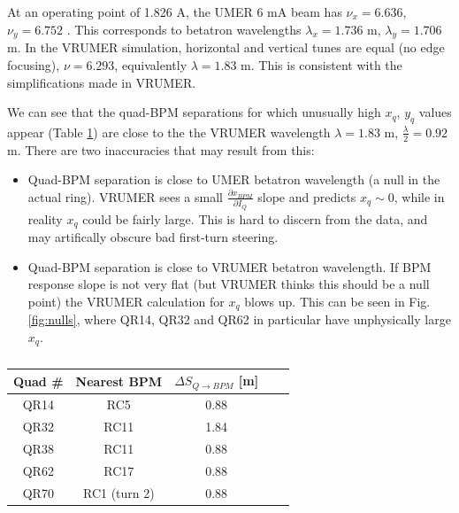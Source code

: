 At an operating point of 1.826 A, the UMER 6 mA beam has $\nu_x = 6.636$, $\nu_y=6.752$ \cite{RKnote:2010}. This corresponds to betatron wavelengths $\lambda_x = 1.736$ m, $\lambda_y=1.706$ m.
In the VRUMER simulation, horizontal and vertical tunes are equal (no edge focusing), $\nu=6.293$, equivalently $\lambda = 1.83$ m. This is consistent with the simplifications made in VRUMER. 

We can see that the quad-BPM separations for which unusually high $x_q$, $y_q$ values appear (Table \ref{tab:nulls}) are close to the the VRUMER wavelength $\lambda = 1.83$ m, $\frac{\lambda}{2} = 0.92$ m. There are two inaccuracies that may result from this:

\begin{itemize}
\item Quad-BPM separation is close to UMER betatron wavelength (a null in the actual ring). VRUMER sees a small $\frac{\partial x_{BPM}}{\partial I_Q}$ slope and predicts $x_q \sim 0$, while in reality $x_q$ could be fairly large. This is hard to discern from the data, and may artifically obscure bad first-turn steering.
\item Quad-BPM separation is close to VRUMER betatron wavelength. If BPM response slope is not very flat (but VRUMER thinks this should be a null point) the VRUMER calculation for $x_q$ blows up. This can be seen in Fig. \ref{fig:nulls}, where QR14, QR32 and QR62 in particular have unphysically large $x_q$.  
\end{itemize}



\begin{table}
\centering
\caption{}
\label{tab:nulls}
\begin{tabular}{|c|c|c|c|c|}
Quad \# & Nearest BPM & $\Delta S_{Q \rightarrow BPM}$ [m] \\
\hline
QR14 & RC5 & 0.88   \\
QR32 & RC11 & 1.84 \\
QR38 & RC11 & 0.88 \\
QR62 & RC17 & 0.88  \\
QR70 & RC1 (turn 2) & 0.88  \\
\end{tabular}
\end{table}



